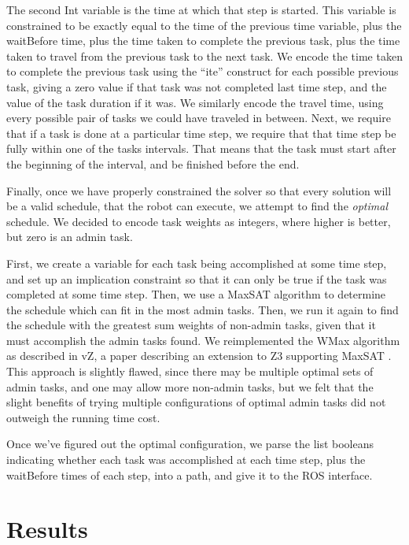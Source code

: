 \documentclass[11pt]{article}
\begin{document}
The second Int variable
is the time at which that step is started.
This variable is constrained
to be exactly equal to the time
of the previous time variable,
plus the waitBefore time,
plus the time taken to complete the previous task,
plus the time taken to travel
from the previous task to the next task.
We encode the time taken to complete the previous task
using the ``ite'' construct for each possible previous task,
giving a zero value if that task was not completed last time step,
and the value of the task duration if it was.
We similarly encode the travel time,
using every possible pair of tasks we could have traveled in between.
Next, we require that if a task is done at a particular time step,
we require that that time step be fully within one of the tasks intervals.
That means that the task must start after the beginning of the interval,
and be finished before the end.

Finally, once we have properly constrained the solver
so that every solution will be a valid schedule,
that the robot can execute,
we attempt to find the \textit{optimal} schedule.
We decided to encode task weights as integers,
where higher is better,
but zero is an admin task.

First, we create a variable
for each task being accomplished
at some time step,
and set up an implication constraint
so that it can only be true
if the task was completed at some time step.
Then, we use a MaxSAT algorithm
to determine the schedule which can fit in the most admin tasks.
Then, we run it again to find the schedule with the greatest
sum weights of non-admin tasks,
given that it must accomplish the admin tasks found.
We reimplemented the WMax algorithm
as described in vZ,
a paper describing an extension to Z3 supporting MaxSAT \cite{vZ}.
This approach is slightly flawed,
since there may be multiple optimal sets of admin tasks,
and one may allow more non-admin tasks,
but we felt that the slight benefits
of trying multiple configurations of optimal admin tasks
did not outweigh the running time cost.

Once we've figured out the optimal configuration,
we parse the list booleans
indicating whether each task was accomplished at each time step,
plus the waitBefore times of each step,
into a path, and give it to the ROS interface.


\section{Results}
\end{document}
